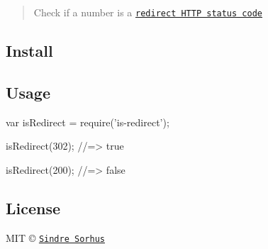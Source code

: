 \begin{quote}
Check if a number is a \href{http://en.wikipedia.org/wiki/List_of_HTTP_status_codes#3xx_Redirection}{\tt redirect H\+T\+TP status code} \end{quote}


\subsection*{Install}




\subsection*{Usage}


\begin{DoxyCode}
var isRedirect = require('is-redirect');

isRedirect(302);
//=> true

isRedirect(200);
//=> false
\end{DoxyCode}


\subsection*{License}

M\+IT © \href{http://sindresorhus.com}{\tt Sindre Sorhus} 